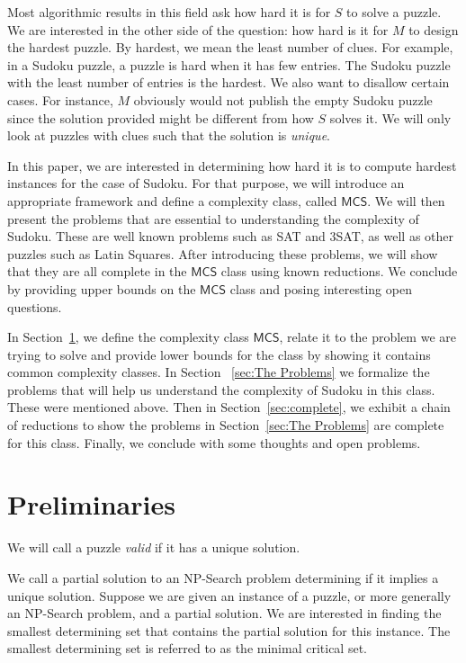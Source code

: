 \documentclass[runningheads,a4paper]{llncs}
\begin{document}
Most algorithmic results in this field ask how hard it is for $S$ to solve a puzzle. We are interested in the other side of the question: how hard is it for $M$ to design the hardest puzzle. By hardest, we mean the least number of clues. For example, in a Sudoku puzzle, a puzzle is hard when it has few entries. The Sudoku puzzle with the least number of entries is the hardest. We also want to disallow certain cases. For instance, $M$ obviously would not publish the empty Sudoku puzzle since the solution provided might be different from how $S$ solves it. We will only look at puzzles with clues such that the solution is \emph{unique}.

In this paper, we are interested in determining how hard it is to compute hardest instances for the case of Sudoku. For that purpose, we will introduce an appropriate framework and define a complexity class, called $\mathsf{MCS}$. We will then present the problems that are essential to understanding the complexity of Sudoku. These are well known problems such as SAT and 3SAT, as well as other puzzles such as Latin Squares. After introducing these problems, we will show that they are all complete in the $\mathsf{MCS}$ class using known reductions. We conclude by providing upper bounds on the $\mathsf{MCS}$ class and posing interesting open questions. 

In Section~\ref{sec:prelim}, we define the complexity class $\mathsf{MCS}$, relate it to the problem we are trying to solve and provide lower bounds for the class by showing it contains common complexity classes. In Section ~\ref{sec:The Problems} we formalize the problems that will help us understand the complexity of Sudoku in this class. These were mentioned above. Then in Section~\ref{sec:complete}, we exhibit a chain of reductions to show the problems in Section~\ref{sec:The Problems} are complete for this class. Finally, we conclude with some thoughts and open problems.

\section{Preliminaries}
\label{sec:prelim}

\begin{definition}
We will call a puzzle \emph{valid} if it has a unique solution.
\end{definition}

\begin{definition}
We call a partial solution to an NP-Search problem determining if it implies a unique solution. Suppose we are given an instance of a puzzle, or more generally an NP-Search problem, and a partial solution. We are interested in finding the smallest determining set that contains the partial solution for this instance. The smallest determining set is referred to as the minimal critical set. 
\end{definition}
\end{document}

